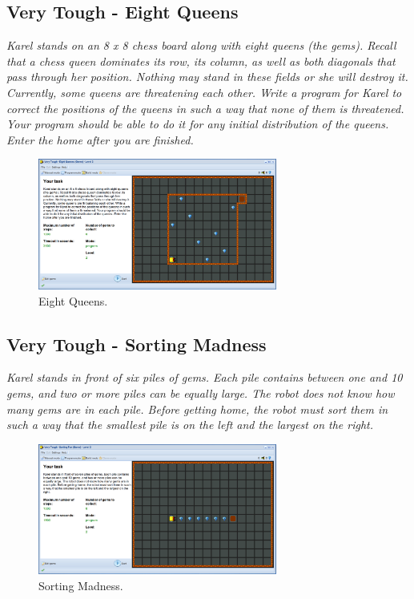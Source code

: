 \documentclass[article,A4,12pt]{llncs}
\begin{document}
\newpage
\subsection{Very Tough - Eight Queens}

{\em Karel stands on an 8 x 8 chess board along with eight queens (the gems). Recall that a chess queen dominates its row, its column, as well as both diagonals that pass through her position. Nothing may stand in these fields or she will destroy it. Currently, some queens are threatening each other. Write a program for Karel to correct the positions of the queens in such a way that none of them is threatened. Your program should be able to do it for any initial distribution of the queens. Enter the home after you are finished.}

\begin{figure}[!ht]
\begin{center}
\includegraphics[width=0.7\textwidth]{img/game-queens.png}
\end{center}
\vspace{-4mm}
\caption{Eight Queens.}
\label{fig:queens}
\vspace{-10mm}
\end{figure}
\noindent

\newpage
\subsection{Very Tough - Sorting Madness}

{\em Karel stands in front of six piles of gems. Each pile contains between one and 10 gems, and two or more piles can be equally large. The robot does not know how many gems are in each pile. Before getting home, the robot must sort them in such a way that the smallest pile is on the left and the largest on the right. }

\begin{figure}[!ht]
\begin{center}
\includegraphics[width=0.7\textwidth]{img/game-sorting.png}
\end{center}
\vspace{-4mm}
\caption{Sorting Madness.}
\label{fig:sorting}
\end{figure}
\noindent
\end{document}
